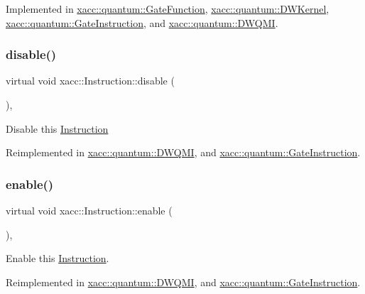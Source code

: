 Implemented in \hyperlink{a01011_aba03de68b76a9e120705c3c389c714a1}{xacc\+::quantum\+::\+Gate\+Function}, \hyperlink{a00983_adae68964db6acd8b4c2267c270a8ec58}{xacc\+::quantum\+::\+D\+W\+Kernel}, \hyperlink{a01015_ad32ad03dfc516e00093030e60178003d}{xacc\+::quantum\+::\+Gate\+Instruction}, and \hyperlink{a00987_a76939c29e4763d10c57ea9a270229421}{xacc\+::quantum\+::\+D\+W\+Q\+MI}.

\mbox{\label{a01155_a6e528da15e05a94cc1d7db268c483271}} 
\subsubsection{\texorpdfstring{disable()}{disable()}}
{\footnotesize\ttfamily virtual void xacc\+::\+Instruction\+::disable (\begin{DoxyParamCaption}{ }\end{DoxyParamCaption})\hspace{0.3cm}{\ttfamily [inline]}, {\ttfamily [virtual]}}

Disable this \hyperlink{a01155}{Instruction} 

Reimplemented in \hyperlink{a00987_af6d9120d8f60984767a330d5cfe9140f}{xacc\+::quantum\+::\+D\+W\+Q\+MI}, and \hyperlink{a01015_a63ce138dd71fb43d303f5600fefb7215}{xacc\+::quantum\+::\+Gate\+Instruction}.

\mbox{\label{a01155_a0b4f2e5a591af28342a3c08e4305e24f}} 
\subsubsection{\texorpdfstring{enable()}{enable()}}
{\footnotesize\ttfamily virtual void xacc\+::\+Instruction\+::enable (\begin{DoxyParamCaption}{ }\end{DoxyParamCaption})\hspace{0.3cm}{\ttfamily [inline]}, {\ttfamily [virtual]}}

Enable this \hyperlink{a01155}{Instruction}. 

Reimplemented in \hyperlink{a00987_ae4f563cead75aaa43f06db83e90ee855}{xacc\+::quantum\+::\+D\+W\+Q\+MI}, and \hyperlink{a01015_a7a80474b7fd465271b3313432db2e608}{xacc\+::quantum\+::\+Gate\+Instruction}.

